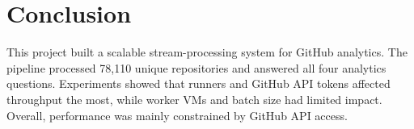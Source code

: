 \documentclass[conference]{IEEEtran}
\begin{document}
\section{Conclusion}
\label{sec:conclusion}
This project built a scalable stream-processing system for GitHub analytics.
The pipeline processed 78,110 unique repositories and answered all four
analytics questions. Experiments showed that runners and GitHub API tokens
affected throughput the most, while worker VMs and batch size had limited
impact. Overall, performance was mainly constrained by GitHub API access.



\end{document}
